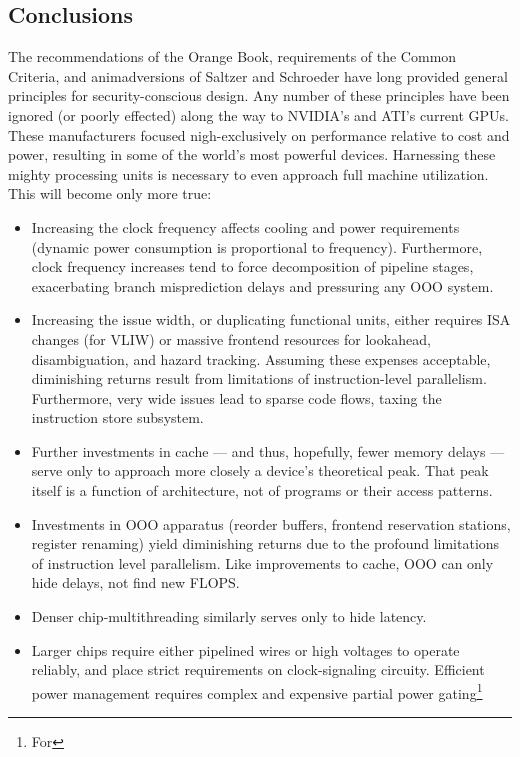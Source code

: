 \documentclass[letterpaper,10pt]{article}
\begin{document}
\begin{multicols}{2}
 \section{Conclusions} 
The recommendations of the Orange Book\cite{orangebook}, requirements of the Common Criteria\cite{ccrit},
and animadversions of Saltzer and Schroeder\cite{principles} have long provided general principles for
security-conscious design. Any number of these principles have been ignored
(or poorly effected) along the way to NVIDIA's and ATI's current GPUs. These
manufacturers focused nigh-exclusively on performance relative to cost and
power, resulting in some of the world's most powerful devices. Harnessing these
mighty processing units is necessary to even approach full machine utilization.
This will become only more true:
\begin{itemize}
\item Increasing the clock frequency affects cooling and power requirements
(dynamic power consumption is proportional to frequency). Furthermore,
clock frequency increases tend to force decomposition of pipeline
stages, exacerbating branch misprediction delays and pressuring any OOO
system\cite{cormean}.
\item Increasing the issue width, or duplicating functional units, either
requires ISA changes (for VLIW) or massive frontend resources for lookahead,
disambiguation, and hazard tracking. Assuming these expenses acceptable,
diminishing returns result from limitations of instruction-level parallelism.
Furthermore, very wide issues lead to sparse code flows, taxing the instruction
store subsystem. 
\item Further investments in cache --- and thus, hopefully, fewer memory
delays --- serve only to approach more closely a device's theoretical peak.
That peak itself is a function of architecture, not of programs or their
access patterns.
\item Investments in OOO apparatus (reorder buffers,
frontend reservation stations, register renaming) yield diminishing returns due
to the profound limitations of instruction level parallelism\cite{phenn}. Like improvements
to cache, OOO can only hide delays, not find new FLOPS\@.
\item Denser chip-multithreading similarly serves only to hide latency.
\item Larger chips require either pipelined wires or high voltages to operate
reliably, and place strict requirements on clock-signaling circuity. Efficient
power management requires complex and expensive partial power gating\footnote{For
}
\end{itemize}
\end{multicols}
\end{document}
